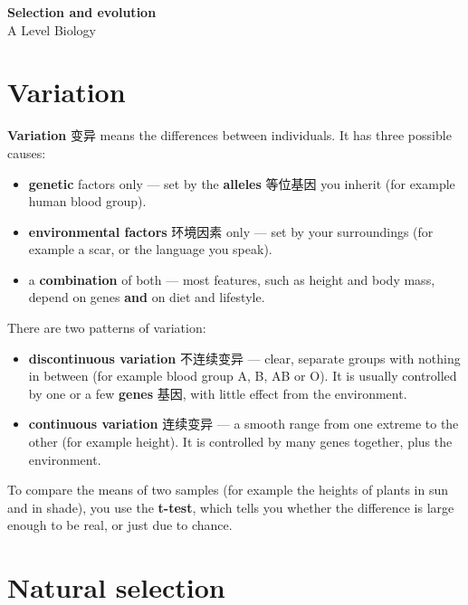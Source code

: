 \documentclass[11pt]{article}
\begin{document}
\begin{center}
  {\LARGE\bfseries Selection and evolution}\\[0.35em]
  {\large A Level Biology}
\end{center}
\vspace{0.6em}

\section*{Variation}

\textbf{Variation} 变异 means the differences between individuals. It has three possible causes:

\begin{itemize}
\item \textbf{genetic} factors only — set by the \textbf{alleles} 等位基因 you inherit (for example human blood group).

\item \textbf{environmental factors} 环境因素 only — set by your surroundings (for example a scar, or the language you speak).

\item a \textbf{combination} of both — most features, such as height and body mass, depend on genes \textbf{and} on diet and lifestyle.

\end{itemize}

There are two patterns of variation:

\begin{itemize}
\item \textbf{discontinuous variation} 不连续变异 — clear, separate groups with nothing in between (for example blood group A, B, AB or O). It is usually controlled by one or a few \textbf{genes} 基因, with little effect from the environment.

\item \textbf{continuous variation} 连续变异 — a smooth range from one extreme to the other (for example height). It is controlled by many genes together, plus the environment.

\end{itemize}

To compare the means of two samples (for example the heights of plants in sun and in shade), you use the \textbf{t-test}, which tells you whether the difference is large enough to be real, or just due to chance.

\section*{Natural selection}
\end{document}
